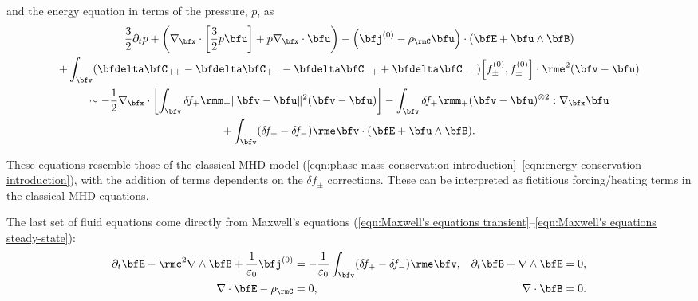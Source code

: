     and the energy equation in terms of the pressure, $p$, as
    \begin{multline}\label{eqn:PiC-coupled pressure conservation}
        \frac{3}{2}\partial_{t}p + \left(\nabla_{\bfx}\cdot\left[\frac{3}{2}p\bfu\right] + p\nabla_{\bfx}\cdot\bfu\right) - \left(\bfj^{(0)} - \rho_{\rmC}\bfu\right)\cdot(\bfE + \bfu\wedge\bfB)  \\
        + \int_{\bfv}(\bfdelta\bfC_{++} - \bfdelta\bfC_{+-} - \bfdelta\bfC_{-+} + \bfdelta\bfC_{--})\!\left[f_{\pm}^{(0)}, f_{\pm}^{(0)}\right]\cdot\rme^{2}(\bfv - \bfu)  \\
        \sim  - \frac{1}{2}\nabla_{\bfx}\cdot\left[\int_{\bfv}\delta\!f_{+}\rmm_{+}\|\bfv - \bfu\|^{2}(\bfv - \bfu)\right] - \int_{\bfv}\delta\!f_{+}\rmm_{+}(\bfv - \bfu)^{\otimes 2}:\nabla_{\bfx}\bfu  \\
        + \int_{\bfv}(\delta\!f_{+} - \delta\!f_{-})\rme\bfv\cdot(\bfE + \bfu\wedge\bfB).
    \end{multline}
    
    These equations resemble those of the classical MHD model (\ref{eqn:phase mass conservation introduction}--\ref{eqn:energy conservation introduction}), with the addition of terms dependents on the $\delta\!f_{\pm}$ corrections. These can be interpreted as fictitious forcing/heating terms in the classical MHD equations.

    The last set of fluid equations come directly from Maxwell's equations (\ref{eqn:Maxwell's equations transient}--\ref{eqn:Maxwell's equations steady-state}):
    \begin{align}
        \partial_{t}\bfE - \rmc^{2}\nabla\wedge\bfB + \frac{1}{\varepsilon_{0}}\bfj^{(0)}  &=  - \frac{1}{\varepsilon_{0}}\int_{\bfv}(\delta\!f_{+} - \delta\!f_{-})\rme\bfv,  &
                                                      \partial_{t}\bfB + \nabla\wedge\bfE  &=  0,  \\
                                                            \nabla\cdot\bfE - \rho_{\rmC}  &=  0,  &
                                                                          \nabla\cdot\bfB  &=  0.  \label{eqn:PiC-coupled Maxwell's equations steady-state}
    \end{align}

    \shortline

